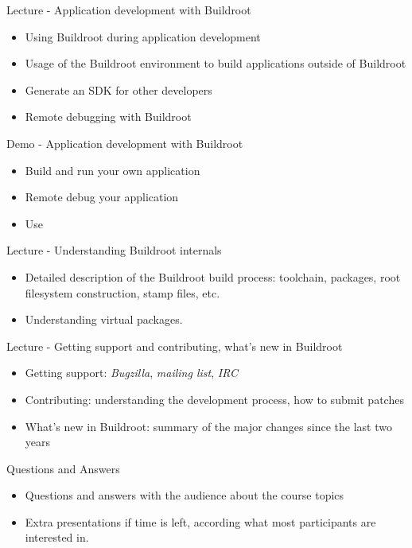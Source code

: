 \documentclass[a4paper,12pt,obeyspaces,spaces,hyphens]{article}
\begin{document}
\feagendatwocolumn
{Lecture - Application development with Buildroot}
{
  \begin{itemize}
  \item Using Buildroot during application development
  \item Usage of the Buildroot environment to build applications
    outside of Buildroot
  \item Generate an SDK for other developers
  \item Remote debugging with Buildroot
  \end{itemize}
}
{Demo - Application development with Buildroot}
{
  \begin{itemize}
  \item Build and run your own application
  \item Remote debug your application
  \item Use 
  \end{itemize}
}

\newpage

\feagendatwocolumn
{Lecture - Understanding Buildroot internals}
{
  \begin{itemize}
  \item Detailed description of the Buildroot build process:
    toolchain, packages, root filesystem construction, stamp files,
    etc.
  \item Understanding virtual packages.
  \end{itemize}
}
{Lecture - Getting support and contributing, what's new in Buildroot}
{
  \begin{itemize}
  \item Getting support: {\em Bugzilla}, {\em mailing list}, {\em IRC}
  \item Contributing: understanding the development process, how to
    submit patches
  \item What's new in Buildroot: summary of the major changes since
    the last two years
  \end{itemize}
}

\feagendaonecolumn
{Questions and Answers}
{
  \begin{itemize}
  \item Questions and answers with the audience about the course topics
  \item Extra presentations if time is left, according what most
        participants are interested in.
  \end{itemize}
}
\end{document}
